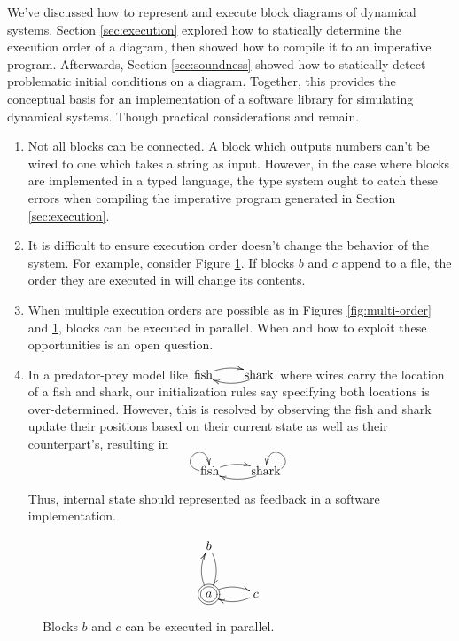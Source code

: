\documentclass[twocolumn]{article}
\begin{document}
We've discussed how to represent and execute block diagrams of dynamical systems. Section \ref{sec:execution} explored how to statically determine the execution order of a diagram, then showed how to compile it to an imperative program. Afterwards, Section \ref{sec:soundness} showed how to statically detect problematic initial conditions on a diagram. Together, this provides the conceptual basis for an implementation of a software library for simulating dynamical systems. Though practical considerations and remain.

\begin{enumerate}
    \item Not all blocks can be connected. A block which outputs numbers can't be wired to one which takes a string as input. However, in the case where blocks are implemented in a typed language, the type system ought to catch these errors when compiling the imperative program generated in Section \ref{sec:execution}.

    \item It is difficult to ensure execution order doesn't change the behavior of the system. For example, consider Figure \ref{fig:parallel}. If blocks $b$ and $c$ append to a file, the order they are executed in will change its contents.

    \item  When multiple execution orders are possible as in Figures \ref{fig:multi-order} and \ref{fig:parallel}, blocks can be executed in parallel. When and how to exploit these opportunities is an open question.

    \item In a predator-prey model like $\xymatrix@1{\text{fish} \ar@/^/[r] & \text{shark} \ar@/^/[l]}$ where wires carry the location of a fish and shark, our initialization rules say specifying both locations is over-determined. However, this is resolved by observing the fish and shark update their positions based on their current state as well as their counterpart's, resulting in
    
    \[
    \xymatrix@1{\text{fish} \ar@(l, u)[] \ar@/^/[r] & \text{shark} \ar@(r, u)[] \ar@/^/[l]}
    \]

    Thus, internal state should represented as feedback in a software implementation.
    
\end{enumerate}

\begin{figure}[h]
\[
\xymatrix{
b \\
*++[o][F=]{a} \ar@/^/[r] \ar@/_/@{<-}[r] \ar@/^/[u] \ar@/_/@{<-}[u] & c \\
}
\]
    \caption{Blocks $b$ and $c$ can be executed in parallel.}
    \label{fig:parallel}
\end{figure}

\printbibliography
\end{document}
